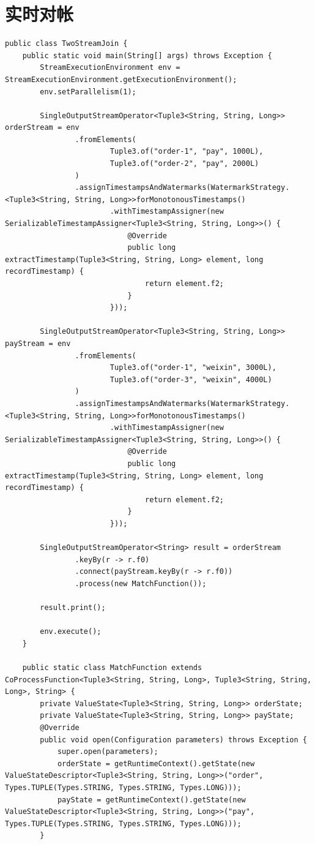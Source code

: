 \documentclass[cn,11pt,chinese]{elegantbook}
\begin{document}
\section{实时对帐}

\begin{verbatim}
public class TwoStreamJoin {
    public static void main(String[] args) throws Exception {
        StreamExecutionEnvironment env = StreamExecutionEnvironment.getExecutionEnvironment();
        env.setParallelism(1);

        SingleOutputStreamOperator<Tuple3<String, String, Long>> orderStream = env
                .fromElements(
                        Tuple3.of("order-1", "pay", 1000L),
                        Tuple3.of("order-2", "pay", 2000L)
                )
                .assignTimestampsAndWatermarks(WatermarkStrategy.<Tuple3<String, String, Long>>forMonotonousTimestamps()
                        .withTimestampAssigner(new SerializableTimestampAssigner<Tuple3<String, String, Long>>() {
                            @Override
                            public long extractTimestamp(Tuple3<String, String, Long> element, long recordTimestamp) {
                                return element.f2;
                            }
                        }));

        SingleOutputStreamOperator<Tuple3<String, String, Long>> payStream = env
                .fromElements(
                        Tuple3.of("order-1", "weixin", 3000L),
                        Tuple3.of("order-3", "weixin", 4000L)
                )
                .assignTimestampsAndWatermarks(WatermarkStrategy.<Tuple3<String, String, Long>>forMonotonousTimestamps()
                        .withTimestampAssigner(new SerializableTimestampAssigner<Tuple3<String, String, Long>>() {
                            @Override
                            public long extractTimestamp(Tuple3<String, String, Long> element, long recordTimestamp) {
                                return element.f2;
                            }
                        }));

        SingleOutputStreamOperator<String> result = orderStream
                .keyBy(r -> r.f0)
                .connect(payStream.keyBy(r -> r.f0))
                .process(new MatchFunction());

        result.print();

        env.execute();
    }

    public static class MatchFunction extends CoProcessFunction<Tuple3<String, String, Long>, Tuple3<String, String, Long>, String> {
        private ValueState<Tuple3<String, String, Long>> orderState;
        private ValueState<Tuple3<String, String, Long>> payState;
        @Override
        public void open(Configuration parameters) throws Exception {
            super.open(parameters);
            orderState = getRuntimeContext().getState(new ValueStateDescriptor<Tuple3<String, String, Long>>("order", Types.TUPLE(Types.STRING, Types.STRING, Types.LONG)));
            payState = getRuntimeContext().getState(new ValueStateDescriptor<Tuple3<String, String, Long>>("pay", Types.TUPLE(Types.STRING, Types.STRING, Types.LONG)));
        }


\end{verbatim}
\end{document}

